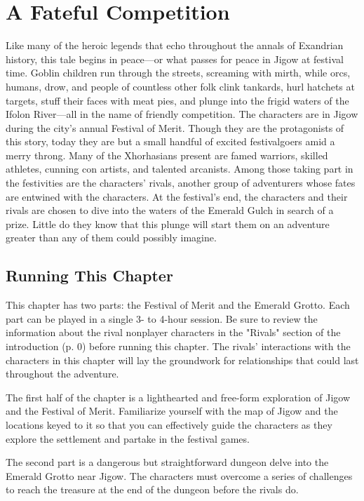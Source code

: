 \documentclass[a4paper, 11pt, bg=full, twocolumn, nooutline]{dndbook}
\begin{document}
\chapter{A Fateful Competition}\label{ch:a-fateful-competition-2-2}

Like many of the heroic legends that echo throughout the annals of Exandrian history, this tale begins in peace---or what passes for peace in Jigow at festival time. Goblin children run through the streets, screaming with mirth, while orcs, humans, drow, and people of countless other folk clink tankards, hurl hatchets at targets, stuff their faces with meat pies, and plunge into the frigid waters of the Ifolon River---all in the name of friendly competition.
The characters are in Jigow during the city's annual Festival of Merit. Though they are the protagonists of this story, today they are but a small handful of excited festivalgoers amid a merry throng. Many of the Xhorhasians present are famed warriors, skilled athletes, cunning con artists, and talented arcanists. Among those taking part in the festivities are the characters' rivals, another group of adventurers whose fates are entwined with the characters.
At the festival's end, the characters and their rivals are chosen to dive into the waters of the Emerald Gulch in search of a prize. Little do they know that this plunge will start them on an adventure greater than any of them could possibly imagine.
\section{Running This Chapter}

This chapter has two parts: the Festival of Merit and the Emerald Grotto. Each part can be played in a single 3- to 4-hour session. Be sure to review the information about the rival nonplayer characters in the "Rivals" section of the introduction (p. 0) before running this chapter. The rivals' interactions with the characters in this chapter will lay the groundwork for relationships that could last throughout the adventure.

The first half of the chapter is a lighthearted and free-form exploration of Jigow and the Festival of Merit. Familiarize yourself with the map of Jigow and the locations keyed to it so that you can effectively guide the characters as they explore the settlement and partake in the festival games.

The second part is a dangerous but straightforward dungeon delve into the Emerald Grotto near Jigow. The characters must overcome a series of challenges to reach the treasure at the end of the dungeon before the rivals do.
\end{document}
